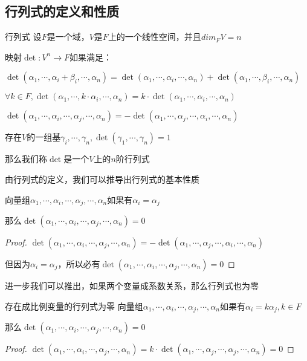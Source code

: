 \documentclass[12pt, a4paper, oneside, UTF8]{ctexbook}
\begin{document}
		\subsection{行列式的定义和性质}
			\begin{defn}{行列式}{}
				设$F$是一个域，$V$是$F$上的一个线性空间，并且$dim_F V = n$

				映射$\det: V^n \rightarrow F$如果满足：

				 $\det(\alpha_1,\cdots,\alpha_i + \beta_i,\cdots,\alpha_n)=\det(\alpha_1,\cdots,\alpha_i,\cdots,\alpha_n)+\det(\alpha_1,\cdots,\beta_i,\cdots,\alpha_n)$

				 $\forall k\in F,\det(\alpha_1,\cdots,k\cdot \alpha_i,\cdots,\alpha_n)=k \cdot \det(\alpha_1,\cdots,\alpha_i,\cdots,\alpha_n)$

				 $\det(\alpha_1,\cdots,\alpha_i,\cdots,\alpha_j,\cdots,\alpha_n)=-\det(\alpha_1,\cdots,\alpha_j,\cdots,\alpha_i,\cdots,\alpha_n)$

				 存在$V$的一组基$\gamma_i,\cdots,\gamma_n,\det(\gamma_1,\cdots,\gamma_n)=1$

				那么我们称$\det$是一个$V$上的$n$阶行列式
			\end{defn}
			由行列式的定义，我们可以推导出行列式的基本性质
			\begin{proposition}
				向量组$\alpha_1,\cdots,\alpha_i,\cdots,\alpha_j,\cdots,\alpha_n$如果有$\alpha_i=\alpha_j$

				那么$\det (\alpha_1,\cdots,\alpha_i,\cdots,\alpha_j,\cdots,\alpha_n)=0$
			\end{proposition}
			\begin{proof}
				$\det (\alpha_1,\cdots,\alpha_i,\cdots,\alpha_j,\cdots,\alpha_n)=-\det (\alpha_1,\cdots,\alpha_j,\cdots,\alpha_i,\cdots,\alpha_n)$

				但因为$\alpha_i=\alpha_j$，所以必有$\det (\alpha_1,\cdots,\alpha_i,\cdots,\alpha_j,\cdots,\alpha_n)=0$
			\end{proof}
			进一步我们可以推出，如果两个变量成系数关系，那么行列式也为零
			\begin{corollary}{存在成比例变量的行列式为零}{}
				向量组$\alpha_1,\cdots,\alpha_i,\cdots,\alpha_j,\cdots,\alpha_n$如果有$\alpha_i=k\alpha_j,k\in F$

				那么$\det (\alpha_1,\cdots,\alpha_i,\cdots,\alpha_j,\cdots,\alpha_n)=0$
			\end{corollary}
			\begin{proof}
				$\det (\alpha_1,\cdots,\alpha_i,\cdots,\alpha_j,\cdots,\alpha_n)=k\cdot \det (\alpha_1,\cdots,\alpha_j,\cdots,\alpha_j,\cdots,\alpha_n)=0$
			\end{proof}
\end{document}
